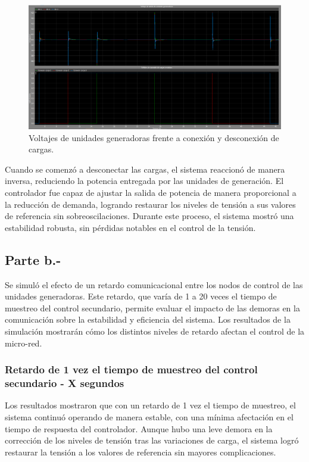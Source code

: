 \begin{figure}
    \centering
    \includegraphics[width=0.5\linewidth]{Tarea 2/report/imagenes/p3a/voltajes.png}
    \caption{Voltajes de unidades generadoras frente a conexión y desconexión de cargas.}
    \label{voltaje_desconexion}
\end{figure}


Cuando se comenzó a desconectar las cargas, el sistema reaccionó de manera inversa, reduciendo la potencia entregada por las unidades de generación. El controlador fue capaz de ajustar la salida de potencia de manera proporcional a la reducción de demanda, logrando restaurar los niveles de tensión a sus valores de referencia sin sobreoscilaciones. Durante este proceso, el sistema mostró una estabilidad robusta, sin pérdidas notables en el control de la tensión.

\subsection{Parte b.-}

Se simuló el efecto de un retardo comunicacional entre los nodos de control de las unidades generadoras. Este retardo, que varía de 1 a 20 veces el tiempo de muestreo del control secundario, permite evaluar el impacto de las demoras en la comunicación sobre la estabilidad y eficiencia del sistema. Los resultados de la simulación mostrarán cómo los distintos niveles de retardo afectan el control de la micro-red.

\subsubsection{Retardo de 1 vez el tiempo de muestreo del control secundario - X segundos}


Los resultados mostraron que con un retardo de 1 vez el tiempo de muestreo, el sistema continuó operando de manera estable, con una mínima afectación en el tiempo de respuesta del controlador. Aunque hubo una leve demora en la corrección de los niveles de tensión tras las variaciones de carga, el sistema logró restaurar la tensión a los valores de referencia sin mayores complicaciones.

